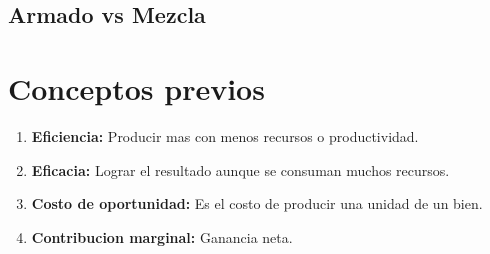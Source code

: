 \documentclass[12pt]{book}
\begin{document}
\subsection{Armado vs Mezcla}

\section{Conceptos previos}
\begin{enumerate}
	\item \textbf{Eficiencia:} Producir mas con menos recursos o productividad.
	\item \textbf{Eficacia:} Lograr el resultado aunque se consuman muchos recursos.
	\item \textbf{Costo de oportunidad:} Es el costo de producir una unidad de un bien.
	\item \textbf{Contribucion marginal:} Ganancia neta.
\end{enumerate}
\end{document}
